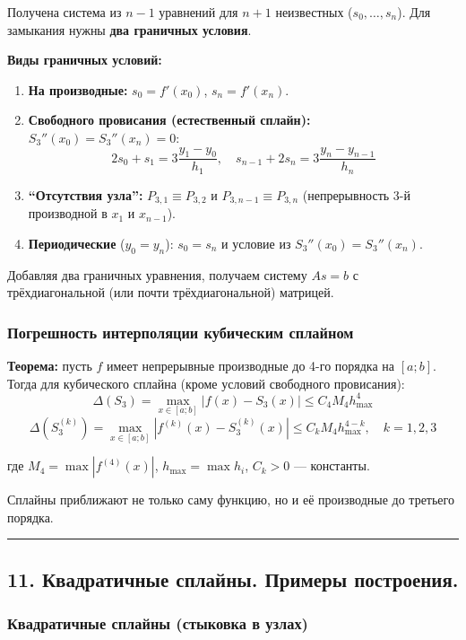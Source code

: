 \documentclass[14pt,a4paper]{extarticle}
\begin{document}
Получена система из $n-1$ уравнений для $n+1$ неизвестных ($s_0, \ldots, s_n$). Для замыкания нужны \textbf{два граничных условия}.

\textbf{Виды граничных условий:}
\begin{enumerate}
    \item \textbf{На производные:} $s_0 = f'(x_0)$, $s_n = f'(x_n)$.
    \item \textbf{Свободного провисания (естественный сплайн):} $S_3''(x_0) = S_3''(x_n) = 0$:
    \[2s_0 + s_1 = 3\frac{y_1 - y_0}{h_1}, \quad s_{n-1} + 2s_n = 3\frac{y_n - y_{n-1}}{h_n}\]
    \item \textbf{``Отсутствия узла'':} $P_{3,1} \equiv P_{3,2}$ и $P_{3,n-1} \equiv P_{3,n}$ (непрерывность 3-й производной в $x_1$ и $x_{n-1}$).
    \item \textbf{Периодические} ($y_0 = y_n$): $s_0 = s_n$ и условие из $S_3''(x_0) = S_3''(x_n)$.
\end{enumerate}

Добавляя два граничных уравнения, получаем систему $As = b$ с трёхдиагональной (или почти трёхдиагональной) матрицей.

\subsubsection{Погрешность интерполяции кубическим сплайном}

\textbf{Теорема:} пусть $f$ имеет непрерывные производные до 4-го порядка на $[a; b]$. Тогда для кубического сплайна (кроме условий свободного провисания):
\[\Delta(S_3) = \max_{x \in [a; b]} |f(x) - S_3(x)| \leq C_4 M_4 h_{\max}^4\]
\[\Delta(S_3^{(k)}) = \max_{x \in [a; b]} |f^{(k)}(x) - S_3^{(k)}(x)| \leq C_k M_4 h_{\max}^{4-k}, \quad k = 1, 2, 3\]

где $M_4 = \max |f^{(4)}(x)|$, $h_{\max} = \max h_i$, $C_k > 0$ --- константы.

Сплайны приближают не только саму функцию, но и её производные до третьего порядка.

\hrule\bigskip

\subsection{11. Квадратичные сплайны. Примеры построения.}

\subsubsection{Квадратичные сплайны (стыковка в узлах)}
\end{document}
